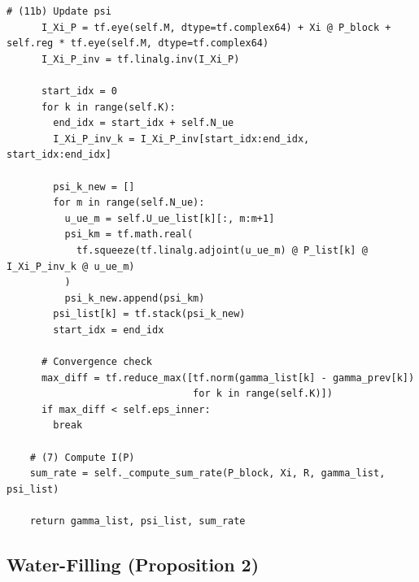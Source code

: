 \documentclass[10pt]{article}
\begin{document}
\begin{lstlisting}[caption={Fixed-Point Computation Method}]
      # (11b) Update psi
      I_Xi_P = tf.eye(self.M, dtype=tf.complex64) + Xi @ P_block + self.reg * tf.eye(self.M, dtype=tf.complex64)
      I_Xi_P_inv = tf.linalg.inv(I_Xi_P)
      
      start_idx = 0
      for k in range(self.K):
        end_idx = start_idx + self.N_ue
        I_Xi_P_inv_k = I_Xi_P_inv[start_idx:end_idx, start_idx:end_idx]
        
        psi_k_new = []
        for m in range(self.N_ue):
          u_ue_m = self.U_ue_list[k][:, m:m+1]
          psi_km = tf.math.real(
            tf.squeeze(tf.linalg.adjoint(u_ue_m) @ P_list[k] @ I_Xi_P_inv_k @ u_ue_m)
          )
          psi_k_new.append(psi_km)
        psi_list[k] = tf.stack(psi_k_new)
        start_idx = end_idx
      
      # Convergence check
      max_diff = tf.reduce_max([tf.norm(gamma_list[k] - gamma_prev[k]) 
                                for k in range(self.K)])
      if max_diff < self.eps_inner:
        break
    
    # (7) Compute I(P)
    sum_rate = self._compute_sum_rate(P_block, Xi, R, gamma_list, psi_list)
    
    return gamma_list, psi_list, sum_rate
\end{lstlisting}

\subsection{Water-Filling (Proposition 2)}
\end{document}
